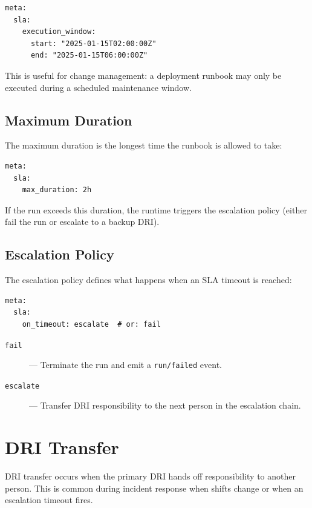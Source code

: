 \begin{verbatim}
meta:
  sla:
    execution_window:
      start: "2025-01-15T02:00:00Z"
      end: "2025-01-15T06:00:00Z"
\end{verbatim}

This is useful for change management: a deployment runbook may only be executed during a scheduled maintenance window.

\subsection{Maximum Duration}

The maximum duration is the longest time the runbook is allowed to take:

\begin{verbatim}
meta:
  sla:
    max_duration: 2h
\end{verbatim}

If the run exceeds this duration, the runtime triggers the escalation policy (either fail the run or escalate to a backup DRI).

\subsection{Escalation Policy}

The escalation policy defines what happens when an SLA timeout is reached:

\begin{verbatim}
meta:
  sla:
    on_timeout: escalate  # or: fail
\end{verbatim}

\begin{description}
  \item[\texttt{fail}] — Terminate the run and emit a \texttt{run/failed} event.
  \item[\texttt{escalate}] — Transfer DRI responsibility to the next person in the escalation chain.
\end{description}

\section{DRI Transfer}

DRI transfer occurs when the primary DRI hands off responsibility to another person. This is common during incident response when shifts change or when an escalation timeout fires.

